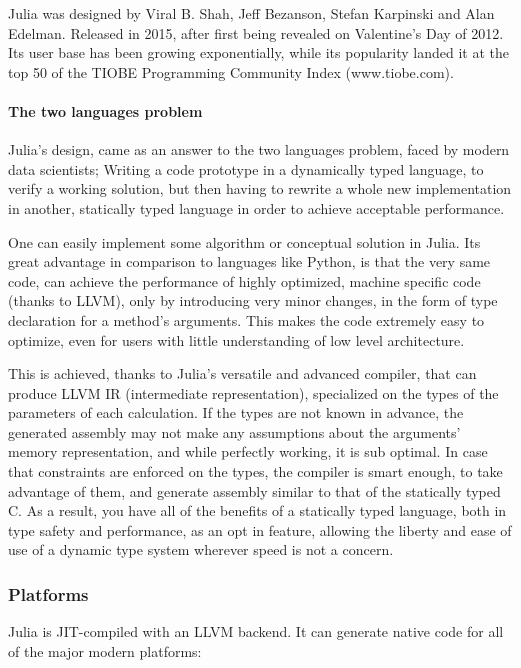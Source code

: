 \documentclass[]{article}
\let\oldparagraph\paragraph
\renewcommand{\paragraph}[1]{\oldparagraph{#1}\mbox{}}
\begin{document}
Julia was designed by Viral B. Shah, Jeff Bezanson, Stefan Karpinski and
Alan Edelman. Released in 2015, after first being revealed on
Valentine's Day of 2012. Its user base has been growing exponentially,
while its popularity landed it at the top 50 of the TIOBE Programming
Community Index (www.tiobe.com).

\paragraph{The two languages problem}\label{the-two-languages-problem}

Julia's design, came as an answer to the two languages problem, faced by
modern data scientists; Writing a code prototype in a dynamically typed
language, to verify a working solution, but then having to rewrite a
whole new implementation in another, statically typed language in order
to achieve acceptable performance.

One can easily implement some algorithm or conceptual solution in Julia.
Its great advantage in comparison to languages like Python, is that the
very same code, can achieve the performance of highly optimized, machine
specific code (thanks to LLVM), only by introducing very minor changes,
in the form of type declaration for a method's arguments. This makes the
code extremely easy to optimize, even for users with little
understanding of low level architecture.

This is achieved, thanks to Julia's versatile and advanced compiler,
that can produce LLVM IR (intermediate representation), specialized on
the types of the parameters of each calculation. If the types are not
known in advance, the generated assembly may not make any assumptions
about the arguments' memory representation, and while perfectly working,
it is sub optimal. In case that constraints are enforced on the types,
the compiler is smart enough, to take advantage of them, and generate
assembly similar to that of the statically typed C. As a result, you
have all of the benefits of a statically typed language, both in type
safety and performance, as an opt in feature, allowing the liberty and
ease of use of a dynamic type system wherever speed is not a concern.

\subsubsection{Platforms}\label{platforms}

Julia is JIT-compiled with an LLVM backend. It can generate native code
for all of the major modern platforms:
\end{document}

